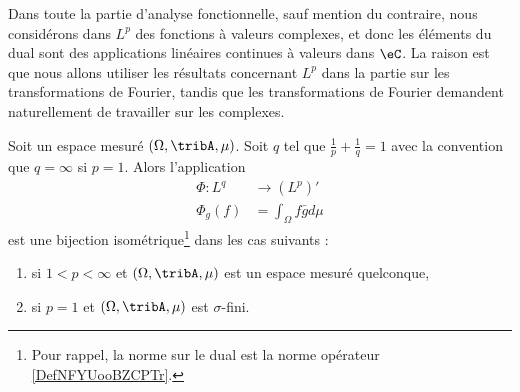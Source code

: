 Dans toute la partie d'analyse fonctionnelle, sauf mention du contraire, nous considérons dans \( L^p\) des fonctions à valeurs complexes, et donc les éléments du dual sont des applications linéaires continues à valeurs dans \( \eC\). La raison est que nous allons utiliser les résultats concernant \( L^p\) dans la partie sur les transformations de Fourier, tandis que les transformations de Fourier demandent naturellement de travailler sur les complexes.

\begin{theorem} \label{ThoLPQPooPWBXuv}
	Soit un espace mesuré \( (\Omega,\tribA,\mu)\). Soit \( q\) tel que \( \frac{1}{ p }+\frac{1}{ q }=1\) avec la convention que \( q=\infty\) si \( p=1\). Alors l'application
	\begin{equation}
		\begin{aligned}
			\Phi\colon L^q & \to (L^p)'                \\
			\Phi_g(f)      & =\int_{\Omega}f\bar gd\mu
		\end{aligned}
	\end{equation}
	est une bijection isométrique\footnote{Pour rappel, la norme sur le dual est la norme opérateur \ref{DefNFYUooBZCPTr}.} dans les cas suivants :
	\begin{enumerate}
		\item       \label{ITEMooSQQBooWSFBmX}
		      si \( 1<p<\infty\) et \( (\Omega,\tribA,\mu)\) est un espace mesuré quelconque,
		\item       \label{ITEMooCQGJooOWzjoV}
		      si \( p=1\) et \( (\Omega,\tribA, \mu)\) est \( \sigma\)-fini.
	\end{enumerate}
\end{theorem}


